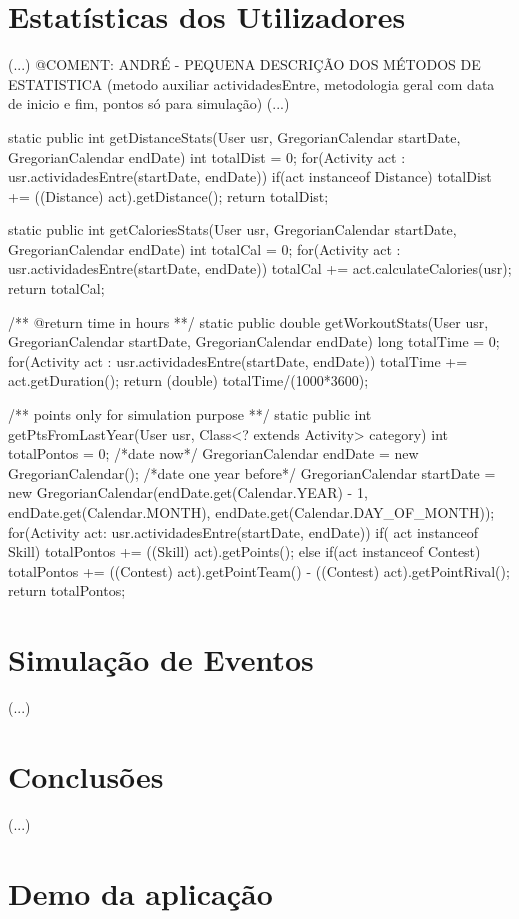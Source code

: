 \documentclass[a4paper,10pt]{report}
\begin{document}
\chapter{Estatísticas dos Utilizadores}
\label{cap:estatisticas}
(...)
@COMENT: ANDRÉ - PEQUENA DESCRIÇÃO DOS MÉTODOS DE ESTATISTICA (metodo auxiliar actividadesEntre, metodologia geral com data de inicio e fim, pontos só para simulação)
(...)
\begin{code}[caption=Métodos para cálculo de estatísticas (src/core/UserStats)., label=code:userStats]
static public int getDistanceStats(User usr, GregorianCalendar startDate, GregorianCalendar endDate){
    int totalDist = 0;
    for(Activity act : usr.actividadesEntre(startDate, endDate))
	if(act instanceof Distance) totalDist += ((Distance) act).getDistance();
    return totalDist;
}

static public int getCaloriesStats(User usr, GregorianCalendar startDate, GregorianCalendar endDate){
    int totalCal = 0;
    for(Activity act : usr.actividadesEntre(startDate, endDate))
	totalCal += act.calculateCalories(usr);
    return totalCal;
}

/** @return time in hours **/
static public double getWorkoutStats(User usr, GregorianCalendar startDate, GregorianCalendar endDate){
    long totalTime = 0;
    for(Activity act : usr.actividadesEntre(startDate, endDate))
	totalTime += act.getDuration();
    return (double) totalTime/(1000*3600);
}
  
/** points only for simulation purpose **/
static public int getPtsFromLastYear(User usr, Class<? extends Activity> category){
    int totalPontos = 0;
    /*date now*/
    GregorianCalendar endDate = new GregorianCalendar();
    /*date one year before*/
    GregorianCalendar startDate = new GregorianCalendar(endDate.get(Calendar.YEAR) - 1, endDate.get(Calendar.MONTH), endDate.get(Calendar.DAY_OF_MONTH));
    for(Activity act: usr.actividadesEntre(startDate, endDate)){
	if( act instanceof Skill) totalPontos += ((Skill) act).getPoints();
	else
	if(act instanceof Contest)
	    totalPontos += ((Contest) act).getPointTeam() - ((Contest) act).getPointRival();
    }
    return totalPontos;
}
\end{code}



\chapter{Simulação de Eventos}
\label{cap:simula}
(...)

\chapter{Conclusões}
\label{cap:concl}
(...)




\appendix
\chapter{Demo da aplicação}
\label{anex:demo}
\end{document}

